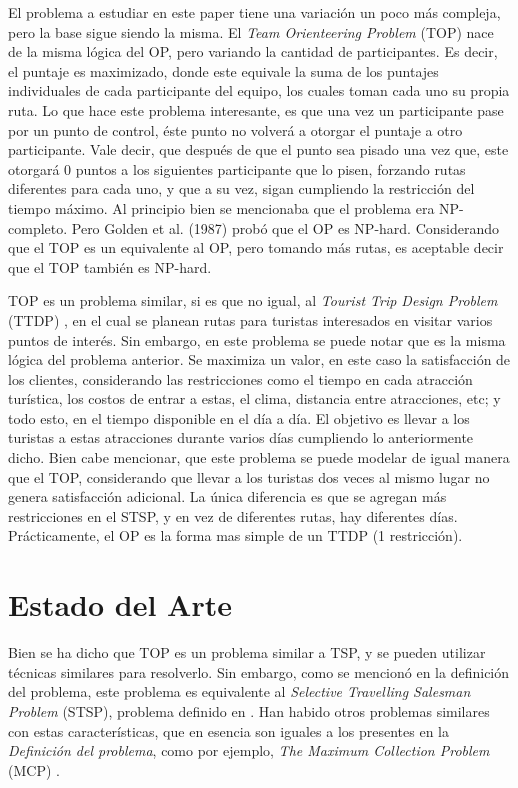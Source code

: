 \documentclass[letter, 10pt]{article}
\begin{document}
 El problema a estudiar en este paper tiene una variación un poco más compleja, pero la base sigue siendo la misma. El \textit{Team Orienteering Problem} (TOP) \cite{Modelo} nace de la misma lógica del OP, pero variando la cantidad de participantes. Es decir, el puntaje es maximizado, donde este equivale la suma de los puntajes individuales de cada participante del equipo, los cuales toman cada uno su propia ruta. Lo que hace este problema interesante, es que una vez un participante pase por un punto de control, éste punto no volverá a otorgar el puntaje a otro participante. Vale decir, que después de que el punto sea pisado una vez que, este otorgará 0 puntos a los siguientes participante que lo pisen, forzando rutas diferentes para cada uno, y que a su vez, sigan cumpliendo la restricción del tiempo máximo. Al principio bien se mencionaba que el problema era NP-completo. Pero Golden et al. (1987) probó que el OP es NP-hard\cite{ProblemaOPNPCompHeuristic}. Considerando que el TOP es un equivalente al OP, pero tomando más rutas, es aceptable decir que el TOP también es NP-hard.
 
 TOP es un problema similar, si es que no igual, al \textit{Tourist Trip Design Problem} (TTDP) \cite{TuristasProblem}, en el cual se planean rutas para turistas interesados en visitar varios puntos de interés. Sin embargo, en este problema se puede notar que es la misma lógica del problema anterior. Se maximiza un valor, en este caso la satisfacción de los clientes, considerando las restricciones como el tiempo en cada atracción turística, los costos de entrar a estas, el clima, distancia entre atracciones, etc; y todo esto, en el tiempo disponible en el día a día. El objetivo es llevar a los turistas a estas atracciones durante varios días cumpliendo lo anteriormente dicho. Bien cabe mencionar, que este problema se puede modelar de igual manera que el TOP, considerando que llevar a los turistas dos veces al mismo lugar no genera satisfacción adicional. La única diferencia es que se agregan más restricciones en el STSP, y en vez de diferentes rutas, hay diferentes días. Prácticamente, el OP es la forma mas simple de un TTDP (1 restricción).



\section{Estado del Arte}

Bien se ha dicho que TOP es un problema similar a TSP, y se pueden utilizar técnicas similares para resolverlo. Sin embargo, como se mencionó en la definición del problema, este problema es equivalente al \textit{Selective Travelling Salesman Problem} (STSP), problema definido  en \cite{ProblemaSTSP}. Han habido otros problemas similares con estas características, que en esencia son iguales a los presentes en la \textit{Definición del problema}, como por ejemplo, \textit{The Maximum Collection Problem} (MCP) \cite{ProblemaMCP}.
\end{document}
